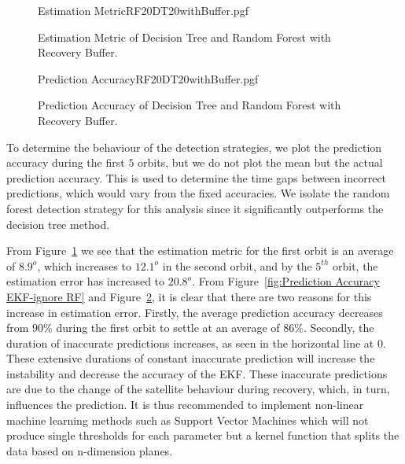 \documentclass[letterpaper, 10 pt, conference]{ieeeconf}  %
\begin{document}
\begin{figure}[!htb]
	\begin{center}
		{Estimation MetricRF20DT20withBuffer.pgf}
	\end{center}
	\caption[Estimation Metric of Decision Tree and Random Forest with Recovery Buffer]{Estimation Metric of Decision Tree and Random Forest with Recovery Buffer.}
	\label{fig:Estimation Accuracy EKF-ignore DT and RF with Recovery Buffer}
\end{figure}

\begin{figure}[!htb]
	\begin{center}
		{Prediction AccuracyRF20DT20withBuffer.pgf}
	\end{center}
	\caption[Prediction Accuracy of Decision Tree and Random Forest with Recovery Buffer]{Prediction Accuracy of Decision Tree and Random Forest with Recovery Buffer.}
	\label{fig:Summary Prediction Accuracy EKF-ignore DT and RF with Recovery Buffer}
\end{figure}

To determine the behaviour of the detection strategies, we plot the prediction accuracy during the first $5$ orbits, but we do not plot the mean but the actual prediction accuracy. This is used to determine the time gaps between incorrect predictions, which would vary from the fixed accuracies. We isolate the random forest detection strategy for this analysis since it significantly outperforms the decision tree method.

From Figure~\ref{fig:Estimation Accuracy EKF-ignore DT and RF with Recovery Buffer} we see that the estimation metric for the first orbit is an average of $8.9^o$, which increases to $12.1^o$ in the second orbit, and by the $5^{th}$ orbit, the estimation error has increased to $20.8^o$. From Figure~\ref{fig:Prediction Accuracy EKF-ignore RF} and Figure~\ref{fig:Summary Prediction Accuracy EKF-ignore DT and RF with Recovery Buffer}, it is clear that there are two reasons for this increase in estimation error. Firstly, the average prediction accuracy decreases from $90\%$ during the first orbit to settle at an average of $86\%$. Secondly, the duration of inaccurate predictions increases, as seen in the horizontal line at $0$. These extensive durations of constant inaccurate prediction will increase the instability and decrease the accuracy of the EKF. These inaccurate predictions are due to the change of the satellite behaviour during recovery, which, in turn, influences the prediction. It is thus recommended to implement non-linear machine learning methods such as Support Vector Machines which will not produce single thresholds for each parameter but a kernel function that splits the data based on n-dimension planes.
\end{document}
